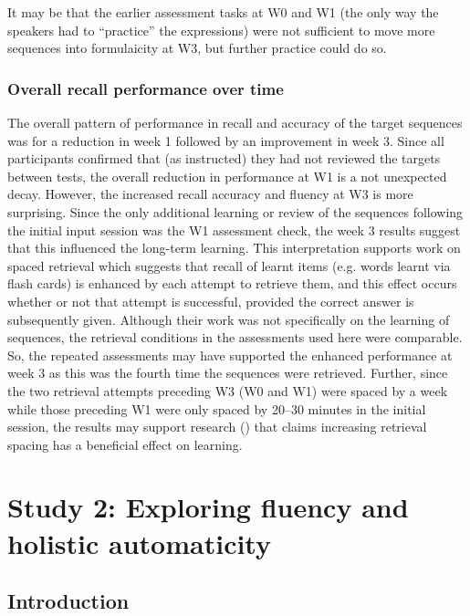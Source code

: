 \documentclass[output=paper]{langscibook}
\begin{document}
It may be that the earlier assessment tasks at W0 and W1 (the only way the speakers had to ``practice'' the expressions) were not sufficient to move more sequences into formulaicity at W3, but further practice could do so. 

\subsubsection{Overall recall performance over time}\label{sec:cutler:2.3.3}
The overall pattern of performance in recall and accuracy of the target sequences was for a reduction in week 1 followed by an improvement in week 3. Since all participants confirmed that (as instructed) they had not reviewed the targets between tests, the overall reduction in performance at W1 is a not unexpected decay. However, the increased recall accuracy and fluency at W3 is more surprising. Since the only additional learning or review of the sequences following the initial input session was the W1 assessment check, the week 3 results suggest that this influenced the long-term learning. This interpretation supports work on spaced retrieval \citep{KornellEtAl2015} which suggests that recall of learnt items (e.g. words learnt via flash cards) is enhanced by each attempt to retrieve them, and this effect occurs whether or not that attempt is successful, provided the correct answer is subsequently given. Although their work was not specifically on the learning of sequences, the retrieval conditions in the assessments used here were comparable. So, the repeated assessments may have supported the enhanced performance at week 3 as this was the fourth time the sequences were retrieved. Further, since the two retrieval attempts preceding W3 (W0 and W1) were spaced by a week while those preceding W1 were only spaced by 20--30 minutes in the initial session, the results may support research (\citealt{KornellVaughn2016}) that claims increasing retrieval spacing has a beneficial effect on learning. 

\section{Study 2: Exploring fluency and holistic automaticity}
\subsection{Introduction}
\end{document}
